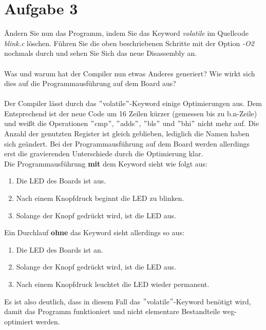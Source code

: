 \section{Aufgabe 3}
Ändern Sie nun das Programm, indem Sie das Keyword \textit{volatile} im Quellcode \textit{blink.c} löschen. Führen Sie die oben beschriebenen Schritte mit der Option \textit{-O2} nochmals durch und sehen Sie Sich das neue Disassembly an.\\ \\
Was und warum hat der Compiler nun etwas Anderes generiert? Wie wirkt sich dies auf die Programmausführung auf dem Board aus?\\ \\
Der Compiler lässt durch das $"$volatile$"$-Keyword einige Optimierungen aus. Dem Entsprechend ist der neue Code um 16 Zeilen kürzer (gemessen bis zu b.n-Zeile) und wei\ss{}t die Operationen $"$cmp$"$, $"$adds$"$, $"$bls$"$ und $"$bhi$"$ nicht mehr auf. Die Anzahl der genutzten Register ist gleich geblieben, lediglich die Namen haben sich geändert. Bei der Programmausführung auf dem Board werden allerdings erst die gravierenden Unterschiede durch die Optimierung klar.\\
Die Programmausführung \textbf{mit} dem Keyword sieht wie folgt aus:
\begin{enumerate}
	\item Die LED des Boards ist aus.
	\item Nach einem Knopfdruck beginnt die LED zu blinken.
	\item Solange der Knopf gedrückt wird, ist die LED aus.
\end{enumerate}
Ein Durchlauf \textbf{ohne} das Keyword sieht allerdings so aus:
\begin{enumerate}
\item Die LED des Boards ist an.
\item Solange der Knopf gedrückt wird, ist die LED aus.
\item Nach einem Knopfdruck leuchtet die LED wieder permanent.
\end{enumerate}
Es ist also deutlich, dass in diesem Fall das $"$volatile$"$-Keyword benötigt wird, damit das Programm funktioniert und nicht elementare Bestandteile weg-optimiert werden.
